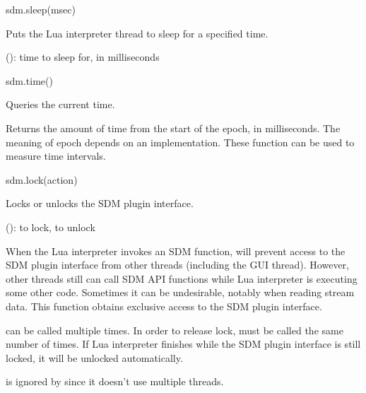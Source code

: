 \documentclass[a4paper,12pt,twoside,extrafontsizes]{memoir}
\begin{document}

\begin{luafuncprototype}
sdm.sleep(msec)
\end{luafuncprototype}

\begin{funcdescr}
	Puts the Lua interpreter thread to sleep for a specified time.
\end{funcdescr}

\begin{funcparams}
	 (): time to sleep for, in milliseconds
\end{funcparams}


\begin{luafuncprototype}
sdm.time()
\end{luafuncprototype}

\begin{funcdescr}
	Queries the current time.
\end{funcdescr}

\begin{funcret}
	Returns the amount of time from the start of the epoch, in milliseconds. The meaning of epoch depends on an implementation. These function can be used to measure time intervals.
\end{funcret}


\begin{luafuncprototype}
sdm.lock(action)
\end{luafuncprototype}

\begin{funcdescr}
	Locks or unlocks the SDM plugin interface.
\end{funcdescr}

\begin{funcparams}
	 ():  to lock,  to unlock
\end{funcparams}

\begin{funcremarks}
	When the Lua interpreter invokes an SDM function,  will prevent access to the SDM plugin interface from other threads (including the GUI thread). However, other threads still can call SDM API functions while Lua interpreter is executing some other code. Sometimes it can be undesirable, notably when reading stream data. This function obtains exclusive access to the SDM plugin interface.
	
	 can be called multiple times. In order to release lock,  must be called the same number of times. If Lua interpreter finishes while the SDM plugin interface is still locked, it will be unlocked automatically.
	
	 is ignored by  since it doesn't use multiple threads.
\end{funcremarks}
\end{document}
